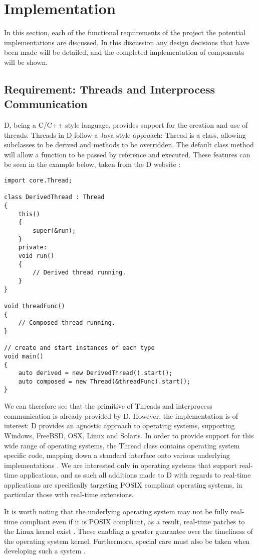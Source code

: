 \section{Implementation}

In this section, each of the functional requirements of the project the potential
implementations are discussed. In this discussion any design decisions that have been
made will be detailed, and the completed implementation of components will be
shown. 

\subsection{Requirement: Threads and Interprocess Communication}
D, being a C/C++ style language, provides support for the creation and use of 
threads. Threads in D follow a Java style approach: Thread is a class, 
allowing subclasses to be derived and methods to be overridden. The default 
class method will allow a function to be passed by reference and executed. 
These features can be seen in the example below, taken from the D website
\cite{core-thread}: 
\begin{lstlisting}
import core.Thread; 

class DerivedThread : Thread
{
    this()
    {
        super(&run);
    }
    private:
    void run()
    {
        // Derived thread running.
    }
}

void threadFunc()
{
    // Composed thread running.
}

// create and start instances of each type
void main()
{
    auto derived = new DerivedThread().start();
    auto composed = new Thread(&threadFunc).start();
}
\end{lstlisting}
We can therefore see that the primitive of Threads and interprocess communication 
is already provided by D. However, the implementation is of interest: D 
provides an agnostic approach to operating systems, supporting Windows, FreeBSD, 
OSX, Linux and Solaris. 
In order to provide support for this wide range of operating systems, the Thread 
class contains operating system specific code, mapping down a standard interface 
onto various underlying implementations 
\cite{github-core-thread}. 
We are interested only in operating systems 
that support real-time applications, and as such all additions made to D with 
regards to real-time applications are specifically targeting POSIX compliant 
operating systems, in particular those with real-time extensions. 
\par\bigskip\noindent
It is worth noting that the underlying operating system may not be fully
real-time compliant even if it is POSIX compliant, as a result, real-time patches 
to the Linux kernel exist \cite{rt-wiki}. These enabling a greater 
guarantee over the timeliness of the operating system kernel. 
Furthermore, special care must also be taken when developing such a system  
\cite {rt-wiki-how-to}. 



